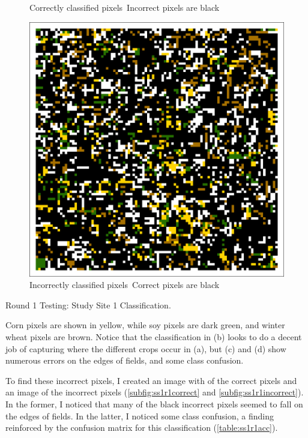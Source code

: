 \begin{ssfigure}
\begin{subfigure}[b]{.475\textwidth}
    \caption{Correctly classified pixels\break~Incorrect pixels are black}
    \label{subfig:ss1r1correct}
  \end{subfigure}
  \quad
  \begin{subfigure}[b]{.475\textwidth}
    \includegraphics[width=\textwidth]{Graphics/Testing/clip1_MODIS_round1_incorrect.pdf}
    \caption{Incorrectly classified pixels\break~Correct pixels are black}
    \label{subfig:ss1r1incorrect}
  \end{subfigure}
  \caption{Round 1 Testing: Study Site 1 Classification.}
  \label{fig:ss1r1class}
  \medskip
  \small
  Corn pixels are shown in yellow, while soy pixels are dark green, and winter wheat pixels are brown. Notice that the classification in (b) looks to do a decent job of capturing where the different crops occur in (a), but (c) and (d) show numerous errors on the edges of fields, and some class confusion.
\end{ssfigure}

To find these incorrect pixels, I created an image with of the correct pixels and an image of the incorrect pixels (\autoref{subfig:ss1r1correct} and \autoref{subfig:ss1r1incorrect}). In the former, I noticed that many of the black incorrect pixels seemed to fall on the edges of fields. In the latter, I noticed some class confusion, a finding reinforced by the confusion matrix for this classification (\autoref{table:ss1r1acc}).

